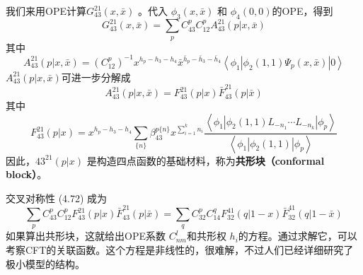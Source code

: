 我们来用OPE计算$ G_{43}^{21}(x, \bar{x})$ 。代入 $\phi_3(x,\bar{x})$ 和 $\phi_4(0,0) $的OPE，得到
\begin{equation}
	G_{43}^{21}(x, \bar{x})=\sum_{p} C_{43}^{p} C_{12}^{p} A_{43}^{21}(p | x, \bar{x})
\end{equation}
其中
\begin{equation}
	A_{43}^{21}(p | x, \bar{x})=\left(C_{12}^{p}\right)^{-1} x^{h_{p}-h_{3}-h_{4}} \bar{x}^{\bar{h}_{p}-\bar{h}_{3}-\bar{h}_{4}}\left\langle\phi_{1}\left|\phi_{2}(1,1) \Psi_{p}(x, \bar{x})\right| 0\right\rangle
\end{equation}
$A_{43}^{21}(p | x, \bar{x}) $可进一步分解成
\begin{equation}
	A_{43}^{21}(p | x, \bar{x})=F_{43}^{21}(p| x) \bar{F}_{43}^{21}(p | \bar{x})
\end{equation}
其中
\begin{equation}
	F_{43}^{21}(p |x)=x^{h_{p}-h_{3}-h_{4}} \sum_{\{n\}} \beta_{43}^{p\{n\}}x^{\sum_{i=1}^{k} n_{i}} \frac{\left\langle\phi_{1}\left|\phi_{2}(1,1) L_{-n_{1}} \cdots L_{-n_{k}}\right| \phi_{p}\right\rangle}{\left\langle\phi_{1}\left|\phi_{2}(1,1)\right| \phi_{p}\right\rangle}
\end{equation}
因此，${43}^{21}(p |x)$ 是构造四点函数的基础材料，称为\textbf{共形块（conformal block）}。

交叉对称性 (4.72) 成为
\begin{equation}
	\sum_{p} C_{43}^{p} C_{12}^{p} F_{43}^{21}(p | x) \bar{F}_{43}^{21}(p | \bar{x})=\sum_{q} C_{32}^{p} C_{14}^{q} F_{32}^{41}(q | 1-x) \bar{F}_{32}^{41}(q | 1-\bar{x})
\end{equation}
如果算出共形块，这就给出OPE系数 $C_{n m}^{l} $和共形权 $h_i $的方程。通过求解它，可以考察CFT的关联函数。这个方程是非线性的，很难解，不过人们已经详细研究了极小模型的结构。
